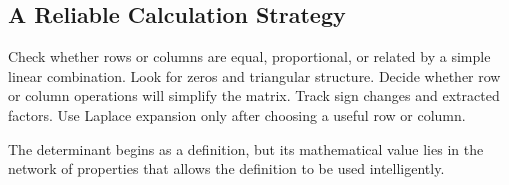 \subsection{A Reliable Calculation Strategy}

\begin{summarybox}
Check whether rows or columns are equal, proportional, or related by a simple linear combination. Look for zeros and triangular structure. Decide whether row or column operations will simplify the matrix. Track sign changes and extracted factors. Use Laplace expansion only after choosing a useful row or column.
\end{summarybox}

The determinant begins as a definition, but its mathematical value lies in the network of properties that allows the definition to be used intelligently.

